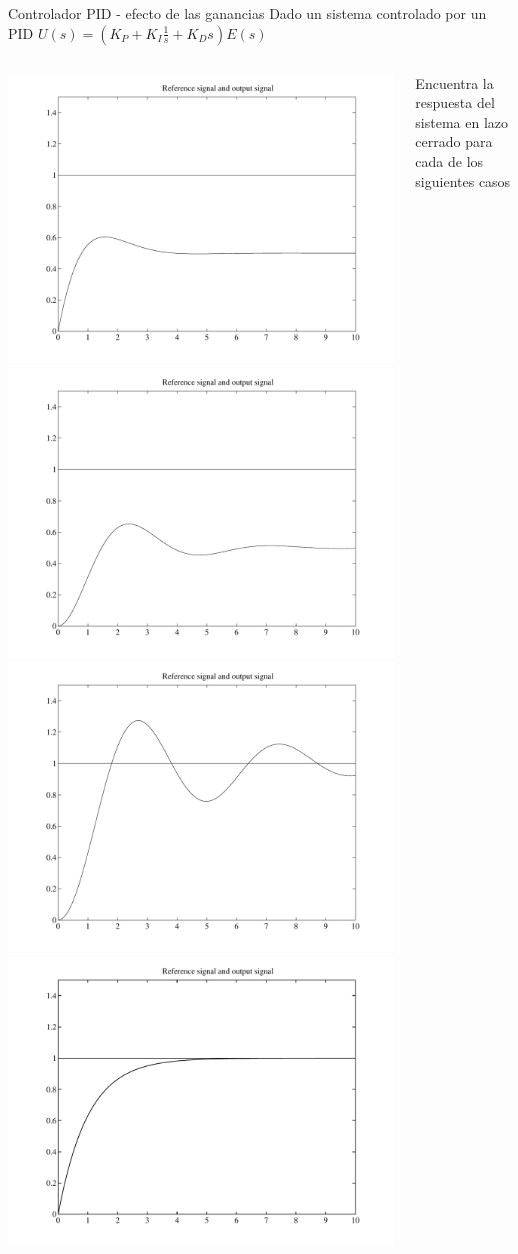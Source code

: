 \documentclass[presentation,aspectratio=169, usenames, dvipsnames]{beamer}
\begin{document}
\begin{frame}[label={sec:orgfd823fc}]{Controlador PID - efecto de las ganancias}
Dado un sistema controlado por un PID \(U(s)=(K_P+K_I \frac{1}{s}+K_D s) E(s)\)
\begin{columns}
\begin{column}{0.7\columnwidth}
   \begin{center}
\includegraphics[width=0.48\linewidth]{../figures/fig930115-1a-1}
\includegraphics[width=0.48\linewidth]{../figures/fig930115-1a-2}\\
\includegraphics[width=0.48\linewidth]{../figures/fig930115-1a-3}
\includegraphics[width=0.48\linewidth]{../figures/fig930115-1a-4}
   \end{center}
\end{column}
\begin{column}{0.3\columnwidth}
Encuentra la respuesta del sistema en lazo cerrado para cada de los siguientes casos


\end{column}
\end{columns}
\end{frame}
\end{document}
